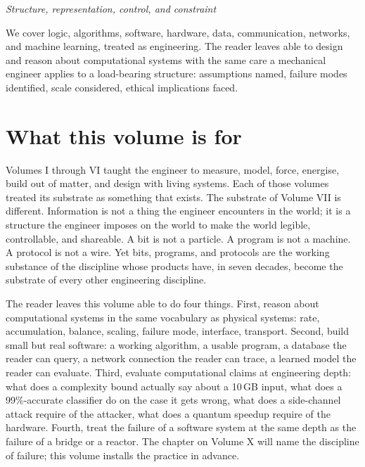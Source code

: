 
\vspace*{1.5cm}
\begin{center}
\itshape\large
Structure, representation, control, and constraint
\end{center}
\vspace{0.5cm}

\noindent
We cover logic, algorithms, software, hardware, data, communication, networks, and machine learning, treated as engineering. The reader leaves able to design and reason about computational systems with the same care a mechanical engineer applies to a load-bearing structure: assumptions named, failure modes identified, scale considered, ethical implications faced.

\vspace{0.5cm}

\section*{What this volume is for}

Volumes I through VI taught the engineer to measure, model, force, energise, build out of matter, and design with living systems. Each of those volumes treated its substrate as something that exists. The substrate of Volume VII is different. Information is not a thing the engineer encounters in the world; it is a structure the engineer imposes on the world to make the world legible, controllable, and shareable. A bit is not a particle. A program is not a machine. A protocol is not a wire. Yet bits, programs, and protocols are the working substance of the discipline whose products have, in seven decades, become the substrate of every other engineering discipline.

The reader leaves this volume able to do four things. First, reason about computational systems in the same vocabulary as physical systems: rate, accumulation, balance, scaling, failure mode, interface, transport. Second, build small but real software: a working algorithm, a usable program, a database the reader can query, a network connection the reader can trace, a learned model the reader can evaluate. Third, evaluate computational claims at engineering depth: what does a complexity bound actually say about a 10\,GB input, what does a 99\%-accurate classifier do on the case it gets wrong, what does a side-channel attack require of the attacker, what does a quantum speedup require of the hardware. Fourth, treat the failure of a software system at the same depth as the failure of a bridge or a reactor. The chapter on Volume X will name the discipline of failure; this volume installs the practice in advance.

